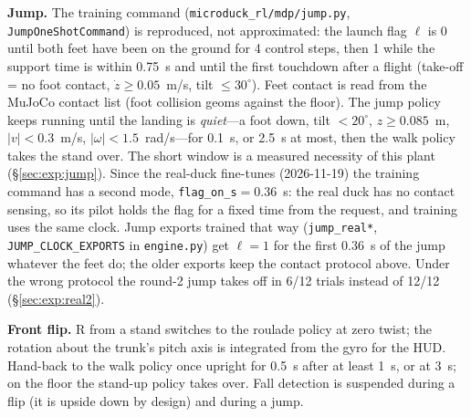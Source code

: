 \documentclass[11pt]{article}
\newcommand{\code}[1]{\texttt{\small #1}}
\begin{document}
\textbf{Jump.} The training command (\code{microduck\_rl/mdp/jump.py}, \code{JumpOneShotCommand}) is reproduced,
not approximated: the launch flag $\ell$ is 0 until both feet have been on the ground for 4 control steps, then 1
while the support time is within 0.75~s and until the first touchdown after a flight (take-off = no foot contact,
$\dot z\ge0.05$~m/s, tilt $\le30^\circ$). Feet contact is read from the MuJoCo contact list (foot collision geoms
against the floor). The jump policy keeps running until the landing is \emph{quiet}---a foot down, tilt $<20^\circ$,
$z\ge0.085$~m, $|v|<0.3$~m/s, $|\omega|<1.5$~rad/s---for 0.1~s, or 2.5~s at most, then the walk policy takes the
stand over. The short window is a measured necessity of this plant (\S\ref{sec:exp:jump}).
Since the real-duck fine-tunes (2026-11-19) the training command has a second mode, \code{flag\_on\_s}$=0.36$~s:
the real duck has no contact sensing, so its pilot holds the flag for a fixed time from the request, and training
uses the same clock. Jump exports trained that way (\code{jump\_real*}, \code{JUMP\_CLOCK\_EXPORTS} in
\code{engine.py}) get $\ell=1$ for the first 0.36~s of the jump whatever the feet do; the older exports keep the
contact protocol above. Under the wrong protocol the round-2 jump takes off in 6/12 trials instead of 12/12
(\S\ref{sec:exp:real2}).

\textbf{Front flip.} R from a stand switches to the roulade policy at zero twist; the rotation about the trunk's
pitch axis is integrated from the gyro for the HUD. Hand-back to the walk policy once upright for 0.5~s after at
least 1~s, or at 3~s; on the floor the stand-up policy takes over. Fall detection is suspended during a flip (it is
upside down by design) and during a jump.
\end{document}
